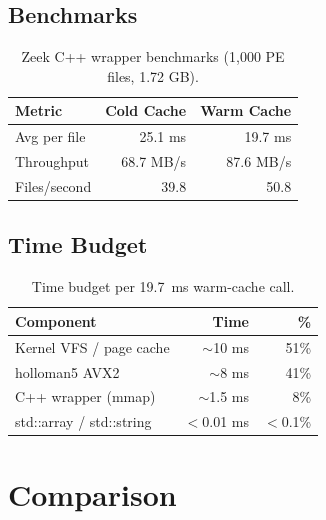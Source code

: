 \documentclass[11pt,a4paper]{article}
\begin{document}
\subsection{Benchmarks}

\begin{table}[h]
\centering
\begin{tabular}{lrr}
\toprule
Metric & Cold Cache & Warm Cache \\
\midrule
Avg per file & 25.1 ms & 19.7 ms \\
Throughput & 68.7 MB/s & 87.6 MB/s \\
Files/second & 39.8 & 50.8 \\
\bottomrule
\end{tabular}
\caption{Zeek C++ wrapper benchmarks (1,000 PE files, 1.72 GB).}
\label{tab:zeek-bench}
\end{table}

\subsection{Time Budget}

\begin{table}[h]
\centering
\begin{tabular}{lrr}
\toprule
Component & Time & \% \\
\midrule
Kernel VFS / page cache & $\sim$10 ms & 51\% \\
holloman5 AVX2 & $\sim$8 ms & 41\% \\
C++ wrapper (mmap) & $\sim$1.5 ms & 8\% \\
std::array / std::string & $<$0.01 ms & $<$0.1\% \\
\bottomrule
\end{tabular}
\caption{Time budget per 19.7~ms warm-cache call.}
\label{tab:budget}
\end{table}

\section{Comparison}
\end{document}
